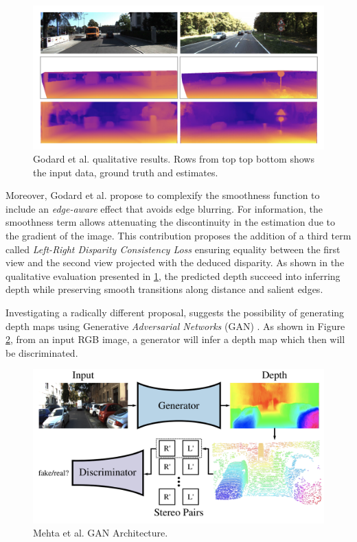 \begin{figure}[h]
	\centering
	\includegraphics[width=0.8\linewidth]{Figures/SOA/illugod1}
	\caption[Godard et al. qualitative results.]{Godard et al. \cite{godard2017unsupervised} qualitative results. Rows from top top bottom shows the input data, ground truth and estimates. }
	\label{illugod1}
\end{figure}


Moreover, Godard et al. propose to complexify the smoothness function to include an \emph{edge-aware} effect that avoids edge blurring. For information, the smoothness term allows attenuating the discontinuity in the estimation due to the gradient of the image. This contribution proposes the addition of a third term called \emph{Left-Right Disparity Consistency Loss} ensuring equality between the first view and the second view projected with the deduced disparity. As shown in the qualitative evaluation presented in \ref{illugod1}, the predicted depth succeed into inferring depth while preserving smooth transitions along distance and salient edges.


Investigating a radically different proposal, \cite{mehta2018structured} suggests the possibility of generating depth maps using Generative \emph{Adversarial Networks} (GAN) \cite{goodfellow2014generative}. As shown in Figure \ref{illumehta}, from an input RGB image, a generator will infer a depth map which then will be discriminated.

\begin{figure}[h]
	\centering
	\includegraphics[width=0.8\linewidth]{Figures/SOA/illumehta}
	\caption[Mehta et al. GAN Architecture.]{Mehta et al. \cite{mehta2018structured} GAN Architecture.}
	\label{illumehta}
\end{figure}

